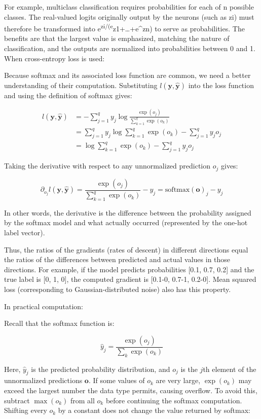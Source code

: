 For example, multiclass classification requires probabilities for each of n possible classes. The real-valued logits originally output by the neurons (such as zi) must therefore be transformed into e\textsuperscript{zi/(e}z1+\ldots+e\^{}zn) to serve as probabilities. The benefits are that the largest value is emphasized, matching the nature of classification, and the outputs are normalized into probabilities between 0 and 1. When cross-entropy loss is used:

Because softmax and its associated loss function are common, we need a better understanding of their computation. Substituting \(l(\mathbf{y},\hat{\mathbf{y}})\) into the loss function and using the definition of softmax gives:

\[
\begin{aligned}
l(\mathbf{y},\hat{\mathbf{y}})
&=-\sum_{j=1}^{q}y_j\log\frac{\exp(o_j)}{\sum_{k=1}^{q}\exp(o_k)}\\
&=\sum_{j=1}^{q}y_j\log\sum_{k=1}^{q}\exp(o_k)-\sum_{j=1}^{q}y_jo_j\\
&=\log\sum_{k=1}^{q}\exp(o_k)-\sum_{j=1}^{q}y_jo_j
\end{aligned}
\]

Taking the derivative with respect to any unnormalized prediction \(o_j\) gives:

\[
\partial_{o_j}l(\mathbf{y},\hat{\mathbf{y}})
=\frac{\exp(o_j)}{\sum_{k=1}^{q}\exp(o_k)}-y_j
=\mathrm{softmax}(\mathbf{o})_j-y_j
\]

In other words, the derivative is the difference between the probability assigned by the softmax model and what actually occurred (represented by the one-hot label vector).

Thus, the ratios of the gradients (rates of descent) in different directions equal the ratios of the differences between predicted and actual values in those directions. For example, if the model predicts probabilities {[}0.1, 0.7, 0.2{]} and the true label is {[}0, 1, 0{]}, the computed gradient is {[}0.1-0, 0.7-1, 0.2-0{]}. Mean squared loss (corresponding to Gaussian-distributed noise) also has this property.

In practical computation:

Recall that the softmax function is:

\[
\hat{y}_j=\frac{\exp(o_j)}{\sum_k\exp(o_k)}
\]

Here, \(\hat{y}_j\) is the predicted probability distribution, and \(o_j\) is the \(j\)th element of the unnormalized predictions \(\mathbf{o}\). If some values of \(o_k\) are very large, \(\exp(o_k)\) may exceed the largest number the data type permits, causing overflow. To avoid this, subtract \(\max(o_k)\) from all \(o_k\) before continuing the softmax computation. Shifting every \(o_k\) by a constant does not change the value returned by softmax:

